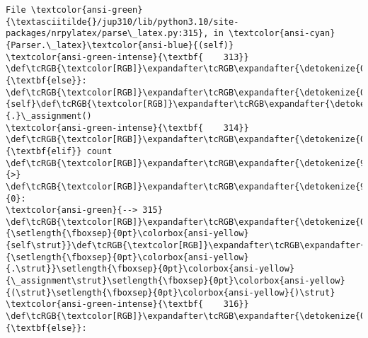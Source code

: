 \documentclass[landscape,letterpaper,10pt,english]{article}
\begin{document}
\begin{Verbatim}[commandchars=\\\{\}, frame=single, framerule=2mm, rulecolor=\color{outerrorbackground}]
File \textcolor{ansi-green}{\textasciitilde{}/jup310/lib/python3.10/site-packages/nrpylatex/parse\_latex.py:315}, in \textcolor{ansi-cyan}{Parser.\_latex}\textcolor{ansi-blue}{(self)}
\textcolor{ansi-green-intense}{\textbf{    313}}     \def\tcRGB{\textcolor[RGB]}\expandafter\tcRGB\expandafter{\detokenize{0,135,0}}{\textbf{else}}: \def\tcRGB{\textcolor[RGB]}\expandafter\tcRGB\expandafter{\detokenize{0,135,0}}{self}\def\tcRGB{\textcolor[RGB]}\expandafter\tcRGB\expandafter{\detokenize{98,98,98}}{.}\_assignment()
\textcolor{ansi-green-intense}{\textbf{    314}} \def\tcRGB{\textcolor[RGB]}\expandafter\tcRGB\expandafter{\detokenize{0,135,0}}{\textbf{elif}} count \def\tcRGB{\textcolor[RGB]}\expandafter\tcRGB\expandafter{\detokenize{98,98,98}}{>} \def\tcRGB{\textcolor[RGB]}\expandafter\tcRGB\expandafter{\detokenize{98,98,98}}{0}:
\textcolor{ansi-green}{--> 315}     \def\tcRGB{\textcolor[RGB]}\expandafter\tcRGB\expandafter{\detokenize{0,135,0}}{\setlength{\fboxsep}{0pt}\colorbox{ansi-yellow}{self\strut}}\def\tcRGB{\textcolor[RGB]}\expandafter\tcRGB\expandafter{\detokenize{98,98,98}}{\setlength{\fboxsep}{0pt}\colorbox{ansi-yellow}{.\strut}}\setlength{\fboxsep}{0pt}\colorbox{ansi-yellow}{\_assignment\strut}\setlength{\fboxsep}{0pt}\colorbox{ansi-yellow}{(\strut}\setlength{\fboxsep}{0pt}\colorbox{ansi-yellow}{)\strut}
\textcolor{ansi-green-intense}{\textbf{    316}} \def\tcRGB{\textcolor[RGB]}\expandafter\tcRGB\expandafter{\detokenize{0,135,0}}{\textbf{else}}:

\end{Verbatim}
\end{document}
